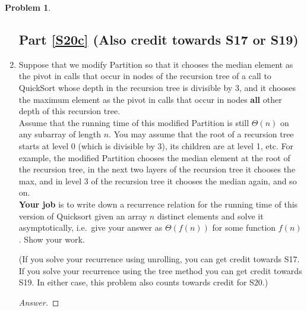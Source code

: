 \documentclass[11pt]{article}
\theoremstyle{definition}
\theoremstyle{definition}
\newtheorem{required}{Problem}
\theoremstyle{definition}
\begin{document}
\begin{required}
\begin{enumerate}[label=(\alph*)]
\newpage
\subsection{Part \ref{S20c} (Also credit towards S17 or S19)}

\item \label{S20c} Suppose that we modify {\sc Partition} so that it chooses the median element as the pivot in calls that occur in nodes of the recursion tree of a call to {\sc QuickSort} whose depth in the recursion tree is divisible by 3, and it chooses the maximum element as the pivot in calls that occur in nodes \textbf{all} other depth of this recursion tree. \\
  
\noindent Assume that the running time of this modified {\sc Partition} is still $\Theta(n)$ on any subarray of length $n$. You may assume that the root of a recursion tree starts at level $0$ (which is divisible by 3), its children are at level 1, etc. For example, the modified {\sc Partition} chooses the median element at the root of the recursion tree, in the next two layers of the recursion tree it chooses the max, and in level 3 of the recursion tree it chooses the median again, and so on. \\
  
\noindent \textbf{Your job} is to write down a recurrence relation for the running time of this version of {\sc Quicksort} given an array $n$ distinct elements and solve it asymptotically, i.e.\ give your answer as $\Theta(f(n))$ for some function $f(n)$. Show your work.

\noindent (If you solve your recurrence using unrolling, you can get credit towards S17. If you solve your recurrence using the tree method you can get credit towards S19. In either case, this problem also counts towards credit for S20.)
\begin{proof}[Answer]
\end{proof}

\end{enumerate}
\end{required}



\end{document}
